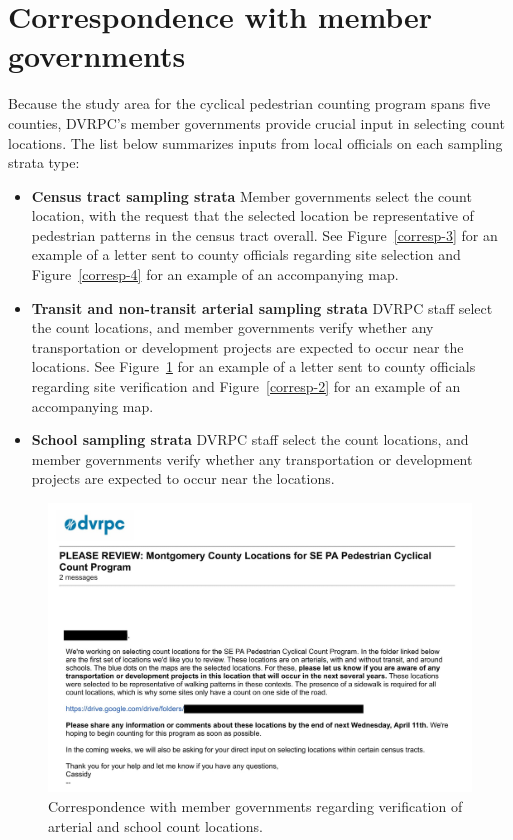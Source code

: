 \documentclass[paper=letterpaper, fontsize=11pt]{scrartcl}
\begin{document}
\section{Correspondence with member governments}
\label{sec:stakeholder-engagement}
Because the study area for the cyclical pedestrian counting program spans five counties, DVRPC's member governments provide crucial input in selecting count locations. The list below summarizes inputs from local officials on each sampling strata type:

\begin{itemize}
	\item \textbf{Census tract sampling strata} Member governments select the count location, with the request that the selected location be representative of pedestrian patterns in the census tract overall. See Figure~\ref{corresp-3} for an example of a letter sent to county officials regarding site selection and Figure~\ref{corresp-4} for an example of an accompanying map.
	\item \textbf{Transit and non-transit arterial sampling strata} DVRPC staff select the count locations, and member governments verify whether any transportation or development projects are expected to occur near the locations. See Figure~\ref{corresp-1} for an example of a letter sent to county officials regarding site verification and Figure~\ref{corresp-2} for an example of an accompanying map.
	\item \textbf{School sampling strata} DVRPC staff select the count locations, and member governments verify whether any transportation or development projects are expected to occur near the locations.
\end{itemize}

\FloatBarrier
\begin{figure}[!htbp]
	\centering
	\includegraphics[width=\textwidth]{county-corresp-1.jpg}
	\caption{Correspondence with member governments regarding verification of arterial and school count locations.}
	\label{corresp-1}
\end{figure}
\FloatBarrier
\end{document}
